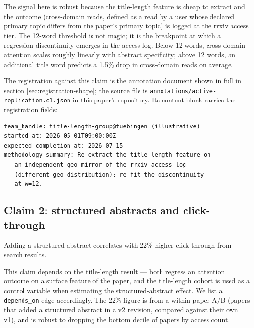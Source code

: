 \documentclass{rrxiv}
\begin{document}
The signal here is robust because the title-length feature is cheap to extract and the outcome (cross-domain reads, defined as a read by a user whose declared primary topic differs from the paper's primary topic) is logged at the rrxiv access tier. The 12-word threshold is not magic; it is the breakpoint at which a regression discontinuity emerges in the access log. Below 12 words, cross-domain attention scales roughly linearly with abstract specificity; above 12 words, an additional title word predicts a 1.5\% drop in cross-domain reads on average.

The registration against this claim is the annotation document shown in full in section \ref{sec:registration-shape}; the source file is \texttt{annotations/active-replication.c1.json} in this paper's repository. Its content block carries the registration fields:

\begin{verbatim}
team_handle: title-length-group@tuebingen (illustrative)
started_at: 2026-05-01T09:00:00Z
expected_completion_at: 2026-07-15
methodology_summary: Re-extract the title-length feature on
   an independent geo mirror of the rrxiv access log
   (different geo distribution); re-fit the discontinuity
   at w=12.
\end{verbatim}

\subsection*{Claim 2: structured abstracts and click-through}
\begin{claim}[type=empirical, evidence=experiment, confidence=0.6, rationale={Within-paper v1-vs-v2 A/B on a constructed demonstration dataset; correlational framing kept deliberately}, labels={worked-example, discoverability}, title={Structured abstracts and click-through}]
\label{claim:c2}
Adding a structured abstract correlates with 22\% higher click-through from search results.
\end{claim}

This claim depends on the title-length result --- both regress an attention outcome on a surface feature of the paper, and the title-length cohort is used as a control variable when estimating the structured-abstract effect. We list a \texttt{depends\_on} edge accordingly. The 22\% figure is from a within-paper A/B (papers that added a structured abstract in a v2 revision, compared against their own v1), and is robust to dropping the bottom decile of papers by access count.
\end{document}
